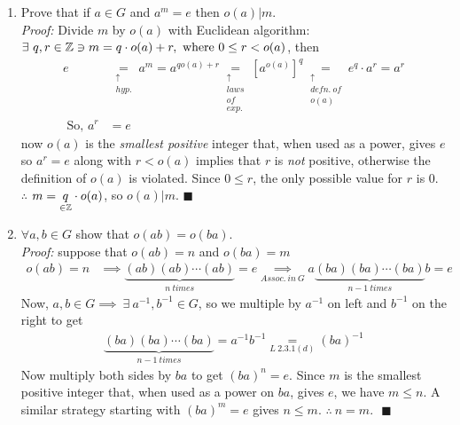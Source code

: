 \begin{enumerate}
    \item Prove that if $a\in G$ and $a^m=e$ then $o(a)|m$. \\
    \textit{Proof: } Divide $m$ by $o(a)$ with Euclidean algorithm: $\exists \ q,r \in {\mathbb{ Z}} \ni m = q\cdot o(a)+r, \text{ where } 0\leq r < o(a)$, then
    \begin{align*}
        e &\underset{\substack{\uparrow \\ hyp.}}{=} a^m 
        = a^{qo(a)+r} 
        \underset{\substack{\uparrow \\ laws \\ of \\ exp.}}{=} [a^{o(a)}]^{q} 
        \underset{\substack{\uparrow \\ defn. \ of \\ o(a)}}{=} e^q\cdot a^r 
        =a^r  \\ 
        \text{ So, } a^r &= e
    \end{align*}
    now $o(a)$ is the \textit{smallest positive} integer that, when used as a power, gives $e$ so $a^r=e$ along with $r<o(a)$ implies that $r$ is \textit{not} positive, otherwise the definition of $o(a)$ is violated. Since $0\leq r $, the only possible value for $r$ is $0$. \\
    $\therefore$ $m=\underset{\in {\mathbb{ Z}}}{q}\cdot o(a)$, so $o(a)|m$. $\blacksquare$ 

    \item $\forall a,b \in G$ show that $o(ab)=o(ba)$. \\
\textit{Proof:} suppose that $o(ab)=n$ and $o(ba)=m$ \\
\begin{align*}
    o(ab)=n &\implies \underbrace{(ab)(ab) \cdots (ab)}_{n \ times} = e \underset{Assoc. \ in \ G}{\implies} a\underbrace{(ba)(ba) \cdots (ba)}_{n-1 \ times}b = e 
\end{align*} 
Now, $a,b \in G \implies \ \exists \ a^{-1}, b^{-1}\in G$, so we multiple by $a^{-1}$ on left and $b^{-1}$ on the right to get
\begin{align*}
    \underbrace{(ba)(ba)\cdots (ba)}_{n-1 \ times} = a^{-1}b^{-1} \underset{L \ 2.3.1(d)}{=} (ba)^{-1}
\end{align*}
Now multiply both sides by $ba$ to get
$(ba)^n=e$. Since $m$ is the smallest positive integer that, when used as a power on $ba$, gives $e$, we have $m\leq n$. A similar strategy starting with $(ba)^m = e$ gives $n\leq m$. 
$\therefore \ n=m. \ \ \ \blacksquare$ 


\end{enumerate}
